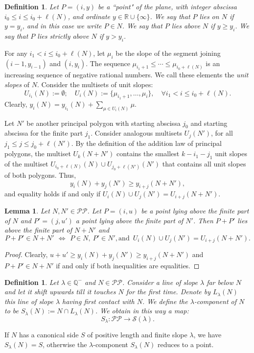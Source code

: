 \documentclass{amsart}
\newtheorem{lemma}[theorem]{Lemma}
\newtheorem{definition}[theorem]{Definition}
\newcommand{\R}{\mathbb R}
\newcommand{\Q}{\mathbb Q}
\def\la{\lambda}
\def\lra{\longrightarrow}
\def\pol{{\mathcal P}{\mathcal P}}
\def\sii{\,\Longleftrightarrow\,}
\def\ss{{\mathcal S}}
\begin{document}
\begin{definition}\label{above}
Let $P=(i,y)$ be a ``point" of the plane, with  integer abscissa $i_0 \le i\le i_0+\ell(N)$, and ordinate $y\in\R\cup\{\infty\}$. We say
that $P$ \emph{lies on} $N$ if $y=y_i$, and in this case we write $P\in N$.
 We say that $P$ \emph{lies above} $N$ if $y\ge y_i$. We say that $P$
\emph{lies strictly above} $N$ if $y>y_i$.
\end{definition}

For any $i_1<i\le i_0+\ell(N)$, let $\mu_i$ be the slope of the segment joining $(i-1,y_{i-1})$ and $(i,y_i)$. The sequence
$\mu_{i_1+1}\le\cdots\le\mu_{i_0+\ell(N)}$ is an increasing sequence of negative rational numbers. We call these elements the \emph{unit slopes} of $N$. Consider the multisets of unit slopes:
$$
U_{i_1}(N):=\emptyset;\quad U_i(N):=\{\mu_{i_1+1},\dots,\mu_i\}, \quad\forall i_1<i\le i_0+\ell(N). 
$$
Clearly, $y_i(N)=y_{i_1}(N)+\sum_{\mu\in U_i(N)}\mu$.

Let $N'$ be another principal polygon with starting abscissa $j_0$ and starting abscissa for the finite part $j_1$. Consider  analogous multisets $U_j(N')$, for all $j_1\le j\le j_0+\ell(N')$. By the definition of the addition law of principal polygons, the multiset $U_k(N+N')$ contains the smallest $k-i_1-j_1$ unit slopes of the multiset $U_{i_0+\ell(N)}(N)\cup U_{j_0+\ell(N')}(N')$ that contains all unit slopes of both polygons. Thus, 
$$
y_i(N)+y_j(N')\ge y_{i+j}(N+N'),
$$
and equality holds if and only if $U_i(N)\cup U_j(N')=U_{i+j}(N+N')$.

\begin{lemma}\label{sum}
Let $N,N'\in\pol$. Let $P=(i,u)$ be a point lying above the finite part of $N$ and
$P'=(j,u')$ a point lying above the finite part of $N'$. Then $P+P'$ lies
above the finite part of $N+N'$ and $$P+P'\in N+N'\ \sii\ P\in N,\ P'\in N',\mbox{
and }\,U_i(N)\cup U_j(N')=U_{i+j}(N+N').$$
\end{lemma}

\begin{proof}
Clearly, $u+u'\ge y_i(N)+y_j(N')\ge y_{i+j}(N+N')$ and $P+P'\in
N+N'$ if and only if both inequalities are equalities.
\end{proof}

\begin{definition}\label{sla}
Let $\la\in\Q^-$ and $N\in\pol$. Consider a line of slope $\la$ far below $N$ and let it shift upwards till it touches $N$ for the first time. Denote by $L_{\la}(N)$ this line of slope $\la$ having first contact with $N$. We define the \emph{$\la$-component} of $N$ to be $S_{\la}(N):=N\cap L_{\la}(N)$. We obtain in this way a map:
$$
S_{\la}\colon \pol\lra \ss(\la).
$$
\end{definition}
If $N$ has a canonical side $S$ of positive length and finite slope $\la$, we have $S_{\la}(N)=S$, otherwise the $\la$-component $S_{\la}(N)$ reduces to a point.
\end{document}
